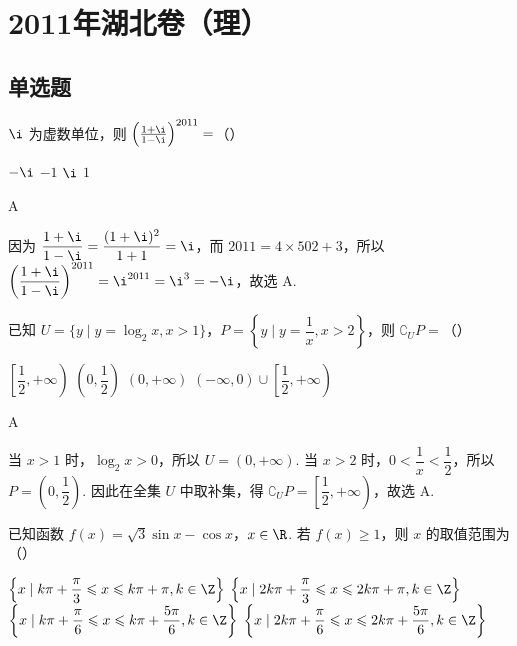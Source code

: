 
\chapter{2011年湖北卷（理）}

\section{单选题}

\begin{problem}
\(\i\) 为虚数单位，则 \(\left(\frac{1+\i}{1-\i}\right)^{2011}=\)（\quad）

\choices
    {\(-\i\)}
    {\(-1\)}
    {\(\i\)}
    {\(1\)}
\end{problem}

\begin{answer}
A
\end{answer}

\begin{solution}
因为 \(\dfrac{1+\i}{1-\i}=\dfrac{(1+\i)^2}{1+1}=\i\)，而 \(2011=4\times502+3\)，所以 \(\left(\dfrac{1+\i}{1-\i}\right)^{2011}=\i^{2011}=\i^3=-\i\)，故选 A.
\end{solution}

\begin{problem}
已知 \(U=\{y\mid y=\log_2x,x>1\}\)，\(P=\left\{y\mid y=\dfrac{1}{x},x>2\right\}\)，则 \(\complement_U P=\)（\quad）

\choices
    {\(\left[\dfrac{1}{2},+\infty\right)\)}
    {\(\left(0,\dfrac{1}{2}\right)\)}
    {\((0,+\infty)\)}
    {\(\left(-\infty,0\right)\cup\left[\dfrac{1}{2},+\infty\right)\)}
\end{problem}

\begin{answer}
A
\end{answer}

\begin{solution}
当 \(x>1\) 时，\(\log_2x>0\)，所以 \(U=(0,+\infty)\). 当 \(x>2\) 时，\(0<\dfrac{1}{x}<\dfrac{1}{2}\)，所以 \(P=\left(0,\dfrac{1}{2}\right)\). 因此在全集 \(U\) 中取补集，得 \(\complement_U P=\left[\dfrac{1}{2},+\infty\right)\)，故选 A.
\end{solution}

\begin{problem}
已知函数 \(f(x)=\sqrt{3}\sin x-\cos x\)，\(x\in\R\). 若 \(f(x)\geqslant1\)，则 \(x\) 的取值范围为（\quad）

\choices
    {\(\left\{x\mid k\pi+\dfrac{\pi}{3}\leqslant x\leqslant k\pi+\pi,k\in\Z\right\}\)}
    {\(\left\{x\mid 2k\pi+\dfrac{\pi}{3}\leqslant x\leqslant2k\pi+\pi,k\in\Z\right\}\)}
    {\(\left\{x\mid k\pi+\dfrac{\pi}{6}\leqslant x\leqslant k\pi+\dfrac{5\pi}{6},k\in\Z\right\}\)}
    {\(\left\{x\mid 2k\pi+\dfrac{\pi}{6}\leqslant x\leqslant2k\pi+\dfrac{5\pi}{6},k\in\Z\right\}\)}
\end{problem}

